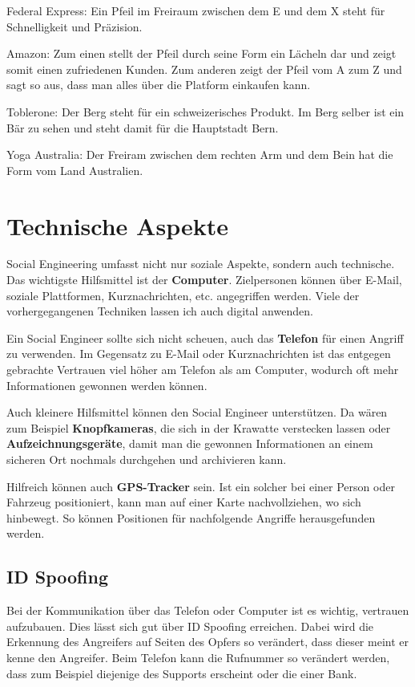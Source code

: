 
Federal Express: Ein Pfeil im Freiraum zwischen dem E und dem X steht für Schnelligkeit und Präzision.

Amazon: Zum einen stellt der Pfeil durch seine Form ein Lächeln dar und zeigt somit einen zufriedenen Kunden. Zum anderen zeigt der Pfeil vom A zum Z und sagt so aus, dass man alles über die Platform einkaufen kann.

Toblerone: Der Berg steht für ein schweizerisches Produkt. Im Berg selber ist ein Bär zu sehen und steht damit für die Hauptstadt Bern.

Yoga Australia: Der Freiram zwischen dem rechten Arm und dem Bein hat die Form vom Land Australien.

\section{Technische Aspekte}
Social Engineering umfasst nicht nur soziale Aspekte, sondern auch technische. Das wichtigste Hilfsmittel ist der \textbf{Computer}. Zielpersonen können über E-Mail, soziale Plattformen, Kurznachrichten, etc. angegriffen werden. Viele der vorhergegangenen Techniken lassen ich auch digital anwenden. 

Ein Social Engineer sollte sich nicht scheuen, auch das \textbf{Telefon} für einen Angriff zu verwenden. Im Gegensatz zu E-Mail oder Kurznachrichten ist das entgegen gebrachte Vertrauen viel höher am Telefon als am Computer, wodurch oft mehr Informationen gewonnen werden können.

Auch kleinere Hilfsmittel können den Social Engineer unterstützen. Da wären zum Beispiel \textbf{Knopfkameras}, die sich in der Krawatte verstecken lassen oder \textbf{Aufzeichnungsgeräte}, damit man die gewonnen Informationen an einem sicheren Ort nochmals durchgehen und archivieren kann.

Hilfreich können auch \textbf{GPS-Tracker} sein. Ist ein solcher bei einer Person oder Fahrzeug positioniert, kann man auf einer Karte nachvollziehen, wo sich hinbewegt. So können Positionen für nachfolgende Angriffe herausgefunden werden.

\subsection{ID Spoofing}
\label{sec:socialengineering:technischeaspekte:idspoofing}
Bei der Kommunikation über das Telefon oder Computer ist es wichtig, vertrauen aufzubauen. Dies lässt sich gut über ID Spoofing erreichen. Dabei wird die Erkennung des Angreifers auf Seiten des Opfers so verändert, dass dieser meint er kenne den Angreifer. Beim Telefon kann die Rufnummer so verändert werden, dass zum Beispiel diejenige des Supports erscheint oder die einer Bank.

